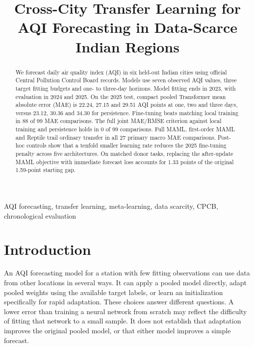 \documentclass[conference]{IEEEtran}
\begin{document}
\title{Cross-City Transfer Learning for AQI Forecasting in Data-Scarce Indian Regions}
\author{
}
\maketitle
\begin{abstract}
We forecast daily air quality index (AQI) in six held-out Indian cities using official Central Pollution Control Board records. Models use seven observed AQI values, three target fitting budgets and one- to three-day horizons. Model fitting ends in 2023, with evaluation in 2024 and 2025. On the 2025 test, compact pooled Transformer mean absolute error (MAE) is 22.24, 27.15 and 29.51 AQI points at one, two and three days, versus 23.12, 30.36 and 34.30 for persistence. Fine-tuning beats matching local training in 88 of 99 MAE comparisons. The full joint MAE/RMSE criterion against local training and persistence holds in 0 of 99 comparisons. Full MAML, first-order MAML and Reptile trail ordinary transfer in all 27 primary macro MAE comparisons. Post-hoc controls show that a tenfold smaller learning rate reduces the 2025 fine-tuning penalty across five architectures. On matched donor tasks, replacing the after-update MAML objective with immediate forecast loss accounts for 1.33 points of the original 1.59-point starting gap.
\end{abstract}
\begin{IEEEkeywords}
AQI forecasting, transfer learning, meta-learning, data scarcity, CPCB, chronological evaluation
\end{IEEEkeywords}

\section{Introduction}
An AQI forecasting model for a station with few fitting observations can use data from other locations in several ways. It can apply a pooled model directly, adapt pooled weights using the available target labels, or learn an initialization specifically for rapid adaptation. These choices answer different questions. A lower error than training a neural network from scratch may reflect the difficulty of fitting that network to a small sample. It does not establish that adaptation improves the original pooled model, or that either model improves a simple forecast.
\end{document}
